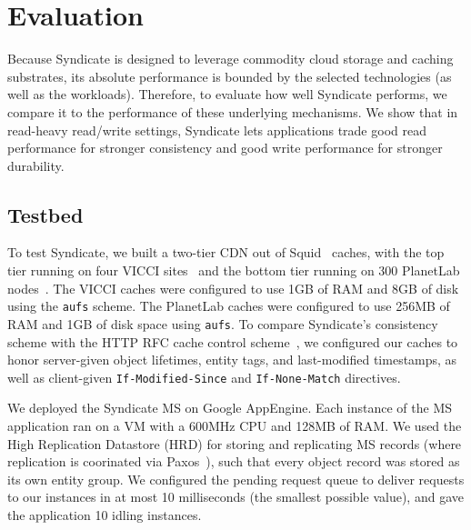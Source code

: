 \section{Evaluation}
\label{sec:evaluation}


Because Syndicate is designed to leverage commodity cloud storage and caching substrates, its absolute performance is bounded by the selected technologies (as well as the workloads). Therefore, to evaluate how well Syndicate performs, we compare it to the performance of these underlying mechanisms. We show that in read-heavy read/write settings, Syndicate lets applications trade good read performance for stronger consistency and good write performance for stronger durability.

\subsection{Testbed}

To test Syndicate, we built a two-tier CDN out of Squid~\cite{Squid} caches, with the top tier running on four VICCI sites~\cite{VICCI} and the bottom tier running on 300 PlanetLab nodes~\cite{PlanetLab}. The VICCI caches were configured to use 1GB of RAM and 8GB of disk using the \texttt{aufs} scheme. The PlanetLab caches were configured to use 256MB of RAM and 1GB of disk space using \texttt{aufs}. To compare Syndicate's consistency scheme with the HTTP RFC cache control scheme~\cite{HTTP-RFC}, we configured our caches to honor server-given object lifetimes, entity tags, and last-modified timestamps, as well as client-given \texttt{If-Modified-Since} and \texttt{If-None-Match} directives.

We deployed the Syndicate MS on Google AppEngine.  Each instance of the MS application ran on a VM with a 600MHz CPU and 128MB of RAM.  We used the High Replication Datastore (HRD) for storing and replicating MS records (where replication is coorinated via Paxos~\cite{paxos}), such that every object record was stored as its own entity group.  We configured the pending request queue to deliver requests to our instances in at most 10 milliseconds (the smallest possible value), and gave the application 10 idling instances.

